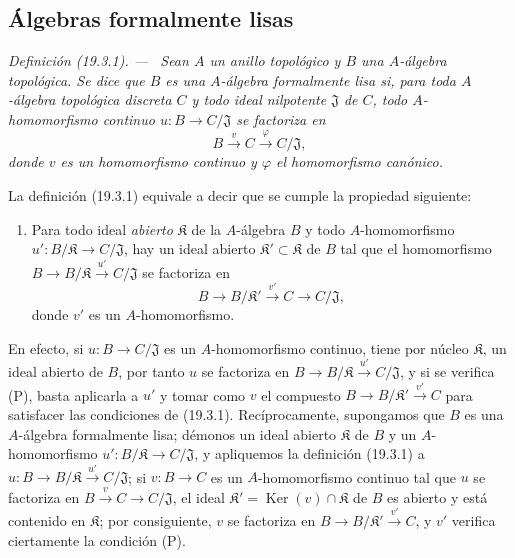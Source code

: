 \documentclass[10pt,oneside]{book}
\makeatletter
\newcommand{\setmanualcurrentlabel}[1]{\def\@currentlabel{#1}}
\newcommand{\oldpage}[2][]{%
  \setcounter{footnote}{0}%
  \marginpar{\scriptsize\textbf{#1}~|~#2}\ignorespaces}
\newenvironment{definition}[1][]{%
  \setmanualcurrentlabel{#1}\par\medskip\noindent\itshape Definición (#1). ---\ }{\par}
\makeatother
\begin{document}
\subsection{Álgebras formalmente lisas}
\label{subsection:0.19.3-es}

\begin{definition}[19.3.1]
\label{0.19.3.1-es}
Sean $A$ un anillo topológico y $B$ una $A$-álgebra topológica. Se dice que
$B$ es una $A$-álgebra formalmente lisa si, para toda
$A$-álgebra topológica \textup{discreta} $C$ y todo ideal \textup{nilpotente} $\mathfrak J$ de
$C$, todo $A$-homomorfismo continuo $u:B\to C/\mathfrak J$ se factoriza en
\[
  B\xrightarrow{v}C\xrightarrow{\varphi}C/\mathfrak J,
\]
donde $v$ es un homomorfismo continuo y $\varphi$ el homomorfismo canónico.
\end{definition}

\oldpage[0\textsubscript{IV-1}]{80}

La definición (19.3.1) equivale a decir que se cumple la propiedad siguiente:
\begin{enumerate}
  \item[(P)] Para todo ideal \emph{abierto} $\mathfrak K$ de la $A$-álgebra $B$ y
  todo $A$-homomorfismo $u':B/\mathfrak K\to C/\mathfrak J$, hay un
  ideal abierto $\mathfrak K'\subset\mathfrak K$ de $B$ tal que
  el homomorfismo
  $B\to B/\mathfrak K\xrightarrow{u'}C/\mathfrak J$ se factoriza en
  \[
    B\to B/\mathfrak K'\xrightarrow{v'}C\to C/\mathfrak J,
  \]
  donde $v'$ es un $A$-homomorfismo.
\end{enumerate}
En efecto, si $u:B\to C/\mathfrak J$ es un $A$-homomorfismo continuo, tiene
por núcleo $\mathfrak K$, un ideal abierto de $B$, por tanto $u$ se factoriza en
$B\to B/\mathfrak K\xrightarrow{u'}C/\mathfrak J$, y si se
verifica (P), basta aplicarla a $u'$ y tomar como $v$ el compuesto
$B\to B/\mathfrak K'\xrightarrow{v'}C$ para satisfacer las condiciones de
(19.3.1). Recíprocamente, supongamos que $B$ es una $A$-álgebra formalmente
lisa; démonos un ideal abierto $\mathfrak K$ de $B$ y un
$A$-homomorfismo $u':B/\mathfrak K\to C/\mathfrak J$, y apliquemos la
definición (19.3.1) a
$u:B\to B/\mathfrak K\xrightarrow{u'}C/\mathfrak J$; si
$v:B\to C$ es un $A$-homomorfismo continuo tal que $u$ se factoriza en
$B\xrightarrow{v}C\to C/\mathfrak J$, el ideal
$\mathfrak K'=\operatorname{Ker}(v)\cap\mathfrak K$ de $B$ es abierto y
está contenido en $\mathfrak K$; por consiguiente, $v$ se factoriza en
$B\to B/\mathfrak K'\xrightarrow{v'}C$, y $v'$ verifica ciertamente la condición
(P).
\end{document}
